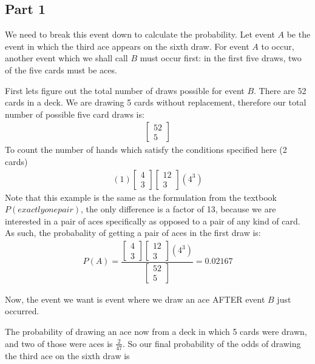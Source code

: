 \documentclass{article}
\begin{document}
\subsection*{Part 1}
We need to break this event down to calculate the probability.
Let event $A$ be the event in which the third ace appears on the sixth draw.
For event $A$ to occur, another event which we shall call $B$ must occur first: in the first five draws, two of the five cards must be aces.

First lets figure out the total number of draws possible for event $B$. There are 52 cards in a deck. We are drawing 5 cards without replacement, therefore our total number of possible five card draws is:
\begin{align*}
\begin{bmatrix}
52 \\
5
\end{bmatrix}
\end{align*}
To count the number of hands which satisfy the conditions specified here (2 cards) 
\begin{align*}
(1)
\begin{bmatrix}
4 \\
3
\end{bmatrix}
\begin{bmatrix}
12 \\
3
\end{bmatrix}
(4^3)
\end{align*}
Note that this example is the same as the formulation from the textbook $P(exactly one pair)$, the only difference is a factor of 13, because we are interested in a pair of aces specifically as opposed to a pair of any kind of card. As such, the probabality of getting a pair of aces in the first draw is:
\begin{align*}
P(A) = \dfrac{
\begin{bmatrix}
4 \\
3
\end{bmatrix}
\begin{bmatrix}
12 \\
3
\end{bmatrix}
(4^3)}
{\begin{bmatrix}
52 \\
5
\end{bmatrix}} = 0.02167
\end{align*}

Now, the event we want is event where we draw an ace AFTER event $B$ just occurred.

The probability of drawing an ace now from a deck in which 5 cards were drawn, and two of those were aces is $\frac{2}{47}$. So our final probability of the odds of drawing the third ace on the sixth draw is
\end{document}
